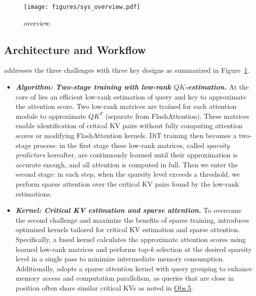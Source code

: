\begin{figure}[t]
    \centering
    \texttt{[image: figures/sys\_overview.pdf]} 
  \caption{\sys overview.}
    \label{fig:sys_overview} 
\end{figure}





\subsection{\sys Architecture and Workflow}
\sys addresses the three challenges with three key designs as summarized in Figure~\ref{fig:sys_overview}.


\begin{itemize}[leftmargin=*]
  \item {\bf \em Algorithm: Two-stage training with low-rank $QK$-estimation.} At the core of \sys lies an efficient low-rank estimation of query and key to approximate the attention score. Two low-rank matrices are trained for each attention module to approximate $QK^T$ (separate from FlashAttention). These matrices enable identification of critical KV pairs without fully computing attention scores or modifying FlashAttention kernels.
  DiT training then becomes a two-stage process: in the first stage these low-rank matrices, called \textit{sparsity predictors} hereafter, are continuously learned until their approximation is accurate enough, and all attention is computed in full. 
  Then we enter the second stage: in each step, when the sparsity level exceeds a threshold, we perform sparse attention over the critical KV pairs found by the low-rank estimations.  
  
  
  \item {\bf \em Kernel: Critical KV estimation and sparse attention.}  To overcome the second challenge and maximize the benefits of sparse training, \sys introduces optimized kernels tailored for critical KV estimation and sparse attention. Specifically, a fused kernel calculates the approximate attention scores using learned low-rank matrices and performs top-$k$ selection at the desired sparsity level in a single pass to minimize intermediate memory consumption.
  Additionally, \sys adopts a sparse attention kernel with query grouping to enhance memory access and computation parallelism, as queries that are close in position often share similar critical KVs as noted in \hyperlink{obs5}{Obs.5}.
  

\end{itemize}
